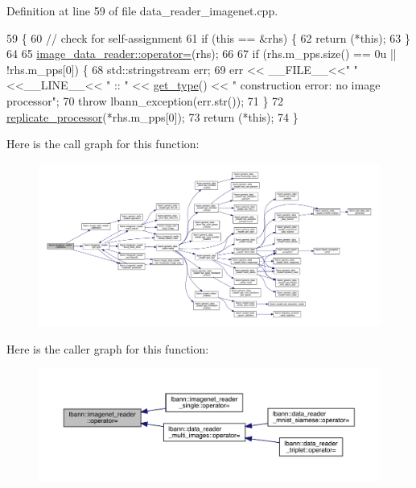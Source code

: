 Definition at line 59 of file data\+\_\+reader\+\_\+imagenet.\+cpp.


\begin{DoxyCode}
59                                                                       \{
60   \textcolor{comment}{// check for self-assignment}
61   \textcolor{keywordflow}{if} (\textcolor{keyword}{this} == &rhs) \{
62     \textcolor{keywordflow}{return} (*\textcolor{keyword}{this});
63   \}
64 
65   \hyperlink{classlbann_1_1image__data__reader_a76a0b52eafb9ad133fb45fec7cf44700}{image\_data\_reader::operator=}(rhs);
66 
67   \textcolor{keywordflow}{if} (rhs.m\_pps.size() == 0u || !rhs.m\_pps[0]) \{
68     std::stringstream err;
69     err << \_\_FILE\_\_<<\textcolor{stringliteral}{" "}<<\_\_LINE\_\_<< \textcolor{stringliteral}{" :: "} << \hyperlink{classlbann_1_1imagenet__reader_a0afea0db8b4286b56211842f8f1d7678}{get\_type}() << \textcolor{stringliteral}{" construction error: no image
       processor"};
70     \textcolor{keywordflow}{throw} lbann\_exception(err.str());
71   \}
72   \hyperlink{classlbann_1_1imagenet__reader_a1b642b5eb01b209e72bdd8dfa139cafd}{replicate\_processor}(*rhs.m\_pps[0]);
73   \textcolor{keywordflow}{return} (*\textcolor{keyword}{this});
74 \}
\end{DoxyCode}
Here is the call graph for this function\+:\nopagebreak
\begin{figure}[H]
\begin{center}
\leavevmode
\includegraphics[width=350pt]{classlbann_1_1imagenet__reader_a5ea15cc16aa679a2cb549b44eb77f323_cgraph}
\end{center}
\end{figure}
Here is the caller graph for this function\+:\nopagebreak
\begin{figure}[H]
\begin{center}
\leavevmode
\includegraphics[width=350pt]{classlbann_1_1imagenet__reader_a5ea15cc16aa679a2cb549b44eb77f323_icgraph}
\end{center}
\end{figure}
